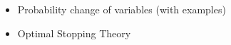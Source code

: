 \documentclass[11pt]{article}
\begin{document}
\section{}
\begin{itemize}
  \item Probability change of variables (with examples)
  \item Optimal Stopping Theory
\end{itemize}

\newpage
\printbibliography[heading=bibintoc]

\end{document}
